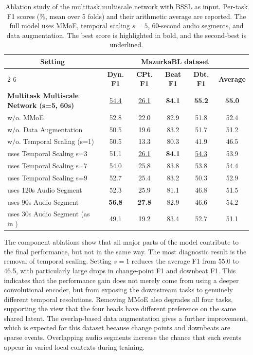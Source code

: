 \begin{table}[!htbp]
\centering
\caption{Ablation study of the multitask multiscale network with BSSL as input. Per-task F1 scores (\%, mean over 5 folds) and their arithmetic average are reported. The full model uses MMoE, temporal scaling $s=5$, 60-second audio segments, and data augmentation. The best score is highlighted in bold, and the second-best is underlined.}
\label{tab:audiodyn_ablation}
\fontsize{10pt}{12pt}\selectfont
\setlength{\tabcolsep}{5pt}
\renewcommand{\arraystretch}{1.3}
\begin{tabular}{l|ccccc}
\toprule
\multicolumn{1}{c|}{\multirow{2}{*}{\textbf{Setting}}}
& \multicolumn{5}{c}{\textbf{MazurkaBL dataset}} \\
\cmidrule(l){2-6}
& \textbf{Dyn. F1} & \textbf{CPt. F1} & \textbf{Beat F1} & \textbf{Dbt. F1} & \textbf{Average} \\
\midrule
\textbf{Multitask Multiscale Network (s=5, 60s)} \quad & \underline{54.4} & \underline{26.1} & \textbf{84.1} & \textbf{55.2} & \textbf{55.0} \\
\quad w/o. MMoE & 52.8 & 22.0 & 82.9 & 51.8 & 52.4 \\
\quad w/o. Data Augmentation & 50.5 & 19.6 & 83.2 & 51.7 & 51.2 \\
\quad w/o. Temporal Scaling (s=1) & 50.5 & 13.3 & 80.3 & 41.9 & 46.5 \\
\quad uses Temporal Scaling s=3 & 51.1 & \underline{26.1} & \textbf{84.1} & \underline{54.3} & 53.9 \\
\quad uses Temporal Scaling s=7 & 54.0 & 25.8 & \underline{83.8} & 53.8 & \underline{54.4} \\
\quad uses Temporal Scaling s=9 & 52.7 & 25.4 & 83.2 & 50.3 & 52.9 \\
\quad uses 120s Audio Segment & 52.3 & 25.9 & 81.1 & 46.8 & 51.5 \\
\quad uses 90s Audio Segment & \textbf{56.8} & \textbf{27.8} & 82.9 & 46.6 & 54.2 \\
\quad uses 30s Audio Segment (as in \cite{foscarin2024beat})& 49.1 & 19.2 & 83.4 & 52.7 & 51.1 \\
\bottomrule
\end{tabular}
\end{table}

The component ablations show that all major parts of the model contribute to the final performance, but not in the same way. The most diagnostic result is the removal of temporal scaling. Setting $s=1$ reduces the average F1 from 55.0 to 46.5, with particularly large drops in change-point F1 and downbeat F1. This indicates that the performance gain does not merely come from using a deeper convolutional encoder, but from exposing the downstream tasks to genuinely different temporal resolutions. Removing MMoE also degrades all four tasks, supporting the view that the four heads have different preference on the same shared latent. The overlap-based data augmentation gives a further improvement, which is expected for this dataset because change points and downbeats are sparse events. Overlapping audio segments increase the chance that such events appear in varied local contexts during training.

